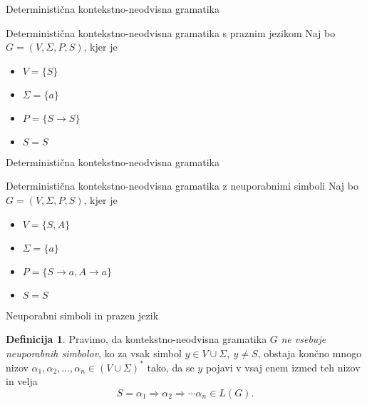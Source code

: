 \documentclass{beamer}
\theoremstyle{definition}
\newtheorem{definicija}{Definicija}[section]
\begin{document}
\begin{frame}{Deterministična kontekstno-neodvisna gramatika}
    \begin{exampleblock}{Deterministična kontekstno-neodvisna gramatika s praznim jezikom}
        Naj bo $ G = ( V, \Sigma, P, S ) $, kjer je 
        \begin{itemize}
            \item<2-> $ V = \{ S \} $
            \item<3-> $ \Sigma = \{ a \} $
            \item<4-> $P = \{ S \rightarrow S \} $
            \item<5-> $ S = S $
        \end{itemize}
        \pause
    \end{exampleblock}
\end{frame}

\begin{frame}{Deterministična kontekstno-neodvisna gramatika}
    \begin{exampleblock}{Deterministična kontekstno-neodvisna gramatika z neuporabnimi simboli}
        Naj bo $ G = ( V, \Sigma, P, S ) $, kjer je 
        \begin{itemize}
            \item $ V = \{ S, A \} $
            \item $ \Sigma = \{ a \} $
            \item $P = \{ S \rightarrow a, A \rightarrow a \} $
            \item $ S = S $
        \end{itemize}
        \pause
    \end{exampleblock}
\end{frame}

\begin{frame}{Neuporabni simboli in prazen jezik}
    \begin{definicija}
        Pravimo, da kontekstno-neodvisna gramatika $G$ \textit{ne vsebuje neuporabnih simbolov}, ko za vsak simbol
        $ y \in V \cup \Sigma, \ y \neq S $, obstaja končno mnogo nizov $ \alpha_1, \alpha_2, \ldots, \alpha_n \in 
        (V \cup \Sigma)^* $ tako, da se $y$ pojavi v vsaj enem izmed teh nizov in velja
        \[
            S = \alpha_1 \Rightarrow \alpha_2 \Rightarrow \cdots \alpha_n \in L(G).
        \] 
    \end{definicija}
\end{frame}
\end{document}

